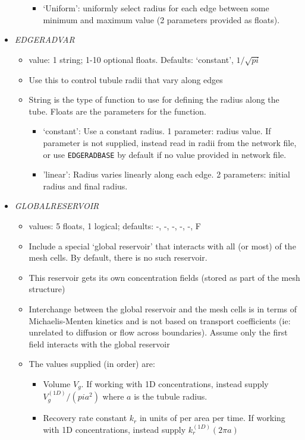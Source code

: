\documentclass[12pt]{article}
\begin{document}
\begin{itemize}
\begin{itemize}
\begin{itemize}
		\item `Uniform': uniformly select radius for each edge between some minimum and maximum value (2 parameters provided as floats).
	\end{itemize}
\end{itemize}
%
\item {\it EDGERADVAR}
\begin{itemize}
	\item  value: 1 string; 1-10 optional floats. Defaults: `constant', $1/\sqrt{pi}$
	\item Use this to control tubule radii that vary along edges
	\item String is the type of function to use for defining the radius along the tube. Floats are the parameters for the function.
	\begin{itemize}
		\item `constant': Use a constant radius. 1 parameter: radius value. If parameter is not supplied, instead read in radii from the network file, or use \verb=EDGERADBASE= by default if no value provided in network file.
		\item 'linear': Radius varies linearly along each edge. 2 parameters: initial radius and final radius.
	\end{itemize}
\end{itemize}
%
\item {\it GLOBALRESERVOIR}
\begin{itemize}
	\item values: 5 floats, 1 logical; defaults: -, -, -, -, -, F
	\item Include a special `global reservoir' that interacts with all (or most) of the mesh cells. By default, there is no such reservoir.
	\item This reservoir gets its own concentration fields (stored as part of the mesh structure)
	\item Interchange between the global reservoir and the mesh cells is in terms of Michaelis-Menten kinetics and is not based on transport coefficients (ie: unrelated to diffusion or flow across boundaries). Assume only the first field interacts with the global reservoir
	\item The values supplied (in order) are:
	\begin{itemize}
		\item Volume $V_g$. If working with 1D concentrations, instead supply $V_g^{(1D)}/(pi a^2)$ where $a$ is the tubule radius.
		\item Recovery rate constant $k_r$ in units of per area per time. If working with 1D concentrations, instead supply $k_r^{(1D)} (2\pi a)$

\end{itemize}
\end{itemize}
\end{itemize}
\end{document}
